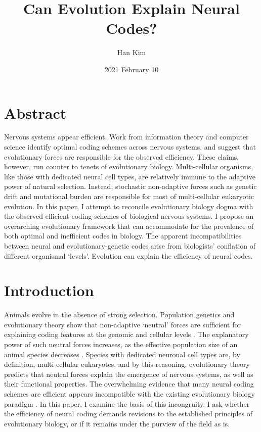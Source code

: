 \documentclass{article}
\begin{document}
\title{Can Evolution Explain Neural Codes?}
\author{Han Kim }
\date{2021 February 10}

\maketitle

\section*{Abstract}

Nervous systems appear efficient. Work from information theory and computer science identify optimal coding schemes across nervous systems, and suggest that evolutionary forces are responsible for the observed efficiency. These claims, however, run counter to tenets of evolutionary biology. Multi-cellular organisms, like those with dedicated neural cell types, are relatively immune to the adaptive power of natural selection. Instead, stochastic non-adaptive forces such as genetic drift and mutational burden are responsible for most of multi-cellular eukaryotic evolution. In this paper, I attempt to reconcile evolutionary biology dogma with the observed efficient coding schemes of biological nervous systems. I propose an overarching evolutionary framework that can accommodate for the prevalence of both optimal and inefficient codes in biology. The apparent incompatibilities between neural and evolutionary-genetic codes arise from biologists' conflation of different organismal `levels'. Evolution can explain the efficiency of neural codes. 

\section{Introduction}

Animals evolve in the absence of strong selection. Population genetics and evolutionary theory show that non-adaptive `neutral' forces are sufficient for explaining coding features at the genomic and cellular levels \cite{Lynch_2007, lynch2007origins}. The explanatory power of such neutral forces increases, as the effective population size of an animal species decreases \cite{Lynch_Conery_2003, kimura1983neutral}. Species with dedicated neuronal cell types are, by definition, multi-cellular eukaryotes, and by this reasoning, evolutionary theory predicts that neutral forces explain the emergence of nervous systems, as well as their functional properties. The overwhelming evidence that many neural coding schemes are efficient appears incompatible with the existing evolutionary biology paradigm \cite{Barlow_2012, Pitkow_Meister_2012, Machens_Gollisch_Kolesnikova_Herz_2005, Mimica_Dunn_Tombaz_Bojja_Whitlock_2018}. In this paper, I examine the basis of this incongruity. I ask whether the efficiency of neural coding demands revisions to the established principles of evolutionary biology, or if it remains under the purview of the field as is.
\end{document}
